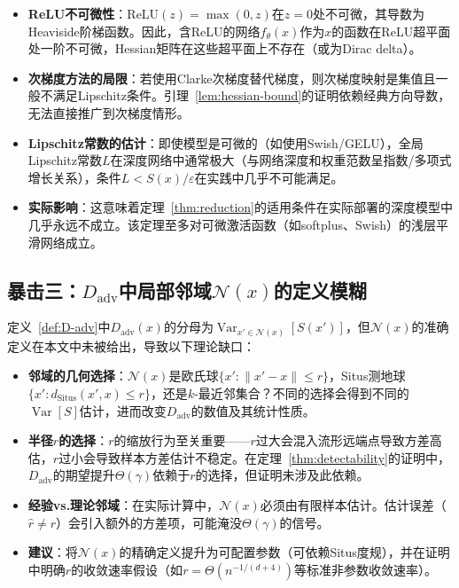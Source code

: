 \documentclass[12pt,a4paper]{article}
\newcommand{\cN}{\mathcal{N}}
\newcommand{\Situs}{\mathrm{Situs}}
\newcommand{\Var}{\operatorname{Var}}
\newcommand{\adv}{\mathrm{adv}}
\begin{document}
\begin{itemize}
  \item \textbf{ReLU不可微性}：ReLU$(z) = \max(0, z)$在$z=0$处不可微，其导数为Heaviside阶梯函数。因此，含ReLU的网络$f_\theta(x)$作为$x$的函数在ReLU超平面处一阶不可微，Hessian矩阵在这些超平面上不存在（或为Dirac delta）。

  \item \textbf{次梯度方法的局限}：若使用Clarke次梯度替代梯度，则次梯度映射是集值且一般不满足Lipschitz条件。引理~\ref{lem:hessian-bound}的证明依赖经典方向导数，无法直接推广到次梯度情形。

  \item \textbf{Lipschitz常数的估计}：即使模型是可微的（如使用Swish/GELU），全局Lipschitz常数$L$在深度网络中通常极大（与网络深度和权重范数呈指数/多项式增长关系），条件$L < S(x)/\varepsilon$在实践中几乎不可能满足。

  \item \textbf{实际影响}：这意味着定理~\ref{thm:reduction}的适用条件在实际部署的深度模型中几乎永远不成立。该定理至多对可微激活函数（如softplus、Swish）的浅层平滑网络成立。
\end{itemize}

\subsection{暴击三：$D_{\adv}$中局部邻域$\cN(x)$的定义模糊}
\label{crit:neighborhood}

定义~\ref{def:D-adv}中$D_{\adv}(x)$的分母为$\Var_{x' \in \cN(x)}[S(x')]$，但$\cN(x)$的准确定义在本文中未被给出，导致以下理论缺口：

\begin{itemize}
  \item \textbf{邻域的几何选择}：$\cN(x)$是欧氏球$\{x': \|x'-x\| \leq r\}$，Situs测地球$\{x': d_{\Situs}(x', x) \leq r\}$，还是$k$-最近邻集合？不同的选择会得到不同的$\Var[S]$估计，进而改变$D_{\adv}$的数值及其统计性质。

  \item \textbf{半径$r$的选择}：$r$的缩放行为至关重要——$r$过大会混入流形远端点导致方差高估，$r$过小会导致样本方差估计不稳定。在定理~\ref{thm:detectability}的证明中，$D_{\adv}$的期望提升$\Theta(\gamma)$依赖于$r$的选择，但证明未涉及此依赖。

  \item \textbf{经验vs.理论邻域}：在实际计算中，$\cN(x)$必须由有限样本估计。估计误差（$\hat{r} \neq r$）会引入额外的方差项，可能淹没$\Theta(\gamma)$的信号。

  \item \textbf{建议}：将$\cN(x)$的精确定义提升为可配置参数（可依赖Situs度规），并在证明中明确$r$的收敛速率假设（如$r = \Theta(n^{-1/(d+4)})$等标准非参数收敛速率）。
\end{itemize}
\end{document}

